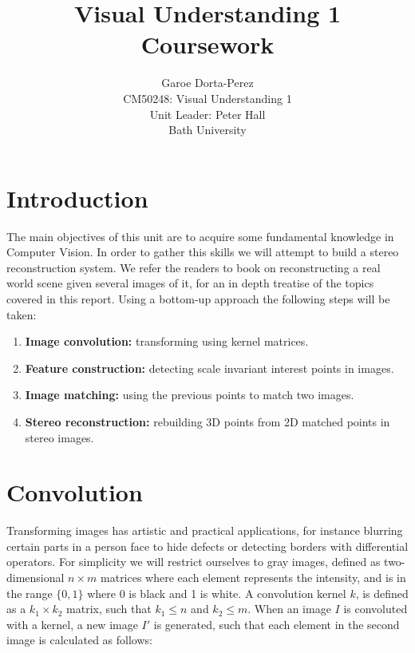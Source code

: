 \documentclass[12pt]{article}
\begin{document}
  
\title{Visual Understanding 1 Coursework}
\author{Garoe Dorta-Perez\\
CM50248: Visual Understanding 1\\
Unit Leader: Peter Hall\\
Bath University}
 
\maketitle
 
\section{Introduction}

The main objectives of this unit are to acquire some fundamental knowledge in Computer Vision.
In order to gather this skills we will attempt to build a stereo reconstruction system.
We refer the readers to \cite{Hartley2004} book on reconstructing a real world scene given several images of it, for an in depth treatise of the topics covered in this report.
Using a bottom-up approach the following steps will be taken:
\begin{enumerate}
\item \textbf{Image convolution:} transforming using kernel matrices.
\item \textbf{Feature construction:} detecting scale invariant interest points in images.
\item \textbf{Image matching:} using the previous points to match two images.
\item \textbf{Stereo reconstruction:} rebuilding 3D points from 2D matched points in stereo images.
\end{enumerate}

\section{Convolution}
\label{sec:convolution}

Transforming images has artistic and practical applications, for instance blurring certain parts in a person face to hide defects or detecting borders with differential operators.
For simplicity we will restrict ourselves to gray images, defined as two-dimensional $n \times m$ matrices where each element represents the intensity, and is in the range $\lbrace  0, 1 \rbrace$ where 0 is black and 1 is white.
A convolution kernel $k$, is defined as a $k_1 \times k_2$ matrix, such that $k_1 \leqslant n$ and $k_2 \leqslant m$.
When an image $I$ is convoluted with a kernel, a new image $I'$ is generated, such that each element in the second image is calculated as follows:
\end{document}
